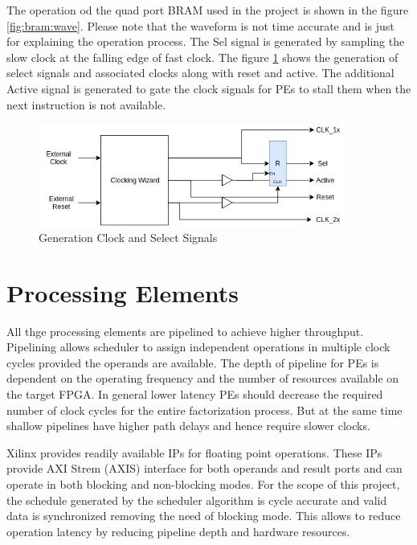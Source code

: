The operation od the quad port BRAM used in the project is shown in the figure \ref{fig:bram:wave}. Please 
note that the waveform is not time accurate and is just for explaining the operation process.
The Sel signal is generated by sampling the slow clock at the falling edge of fast clock. The figure 
\ref{fig:bram:sigGen} shows the generation of select signals and associated clocks along with reset and
active. The additional Active signal is generated to gate the clock signals for PEs to 
stall them when the next instruction is not available.

\begin{figure}
    \centering
    \includegraphics[width = 0.9\textwidth]{./Hardware/clock.jpg}
    \caption{Generation Clock and Select Signals}
    \label{fig:bram:sigGen}
\end{figure}

\section{Processing Elements}
All thge processing elements are pipelined to achieve higher throughput. Pipelining 
allows scheduler to assign independent operations in multiple clock cycles provided the operands
are available. The depth of pipeline for PEs is dependent on the operating frequency and 
the number of resources available on the target FPGA. In general lower latency PEs should
decrease the required number of clock cycles for the entire factorization process. But at the 
same time shallow pipelines have higher path delays and hence require slower clocks.

Xilinx provides readily available IPs for floating point operations. These IPs 
provide AXI Strem (AXIS) interface for both operands and result ports and can operate
in both blocking and non-blocking modes. For the scope of this project, the schedule
generated by the scheduler algorithm is cycle accurate and valid data is synchronized 
removing the need of blocking mode. This allows to reduce operation latency by reducing
pipeline depth and hardware resources.

